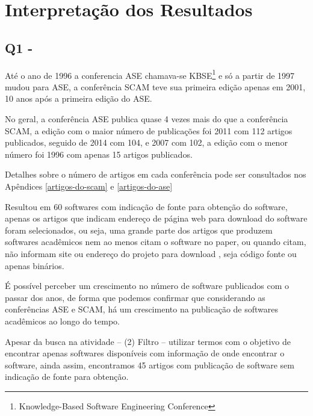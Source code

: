 \section{Interpretação dos Resultados} \label{estudo1:interpretacao}

\subsection{Q1 - \EstudoUmQuestaoUm} %

Até o ano de 1996 a conferencia ASE chamava-se KBSE\footnote{ Knowledge-Based
Software Engineering Conference} e só a partir de 1997 mudou para ASE, a
conferência SCAM teve sua primeira edição apenas em 2001, 10 anos após a
primeira edição do ASE.

No geral, a conferência ASE publica quase 4 vezes mais do que a conferência
SCAM, a edição com o maior número de publicações foi 2011 com 112 artigos
publicados, seguido de 2014 com 104, e 2007 com 102, a edição com o menor
número foi 1996 com apenas 15 artigos publicados.

Detalhes sobre o número de artigos
em cada conferência pode ser consultados nos Apêndices
\ref{artigos-do-scam} e \ref{artigos-do-ase} 



Resultou em 60 softwares com indicação de fonte para obtenção do
software, apenas os artigos que indicam endereço de página web para download do
software foram selecionados, ou seja, uma grande parte dos artigos que produzem
softwares acadêmicos nem ao menos citam o software no paper, ou quando citam,
não informam site ou endereço do projeto para download
\cite{allen2017engineering}, seja código fonte ou apenas binários.


É possível perceber um crescimento no número de software publicados com o
passar dos anos, de forma que podemos confirmar que considerando as
conferências ASE e SCAM, há um crescimento na publicação de softwares
acadêmicos ao longo do tempo.

Apesar da busca na atividade -- (2) Filtro -- utilizar termos com o objetivo de
encontrar apenas softwares disponíveis com informação de onde encontrar o
software, ainda assim, encontramos 45 artigos com publicação de software sem
indicação de fonte para obtenção.

